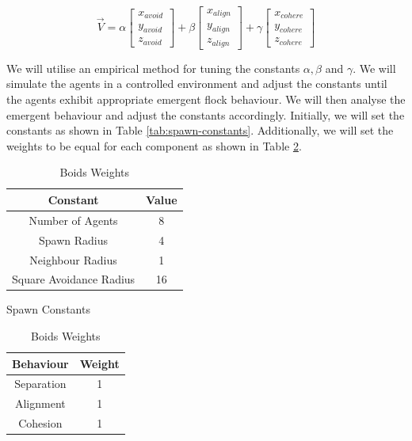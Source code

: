 \documentclass[12pt]{article}
\begin{document}
\begin{equation}
    \vec{V} = \alpha
    \begin{bmatrix}
    x_{avoid} \\
    y_{avoid} \\
    z_{avoid}
    \end{bmatrix}
    +
    \beta
    \begin{bmatrix}
    x_{align} \\
    y_{align} \\
    z_{align}
    \end{bmatrix}
    +
    \gamma
    \begin{bmatrix}
    x_{cohere} \\
    y_{cohere} \\
    z_{cohere}
    \end{bmatrix}
\end{equation}

We will utilise an empirical method for tuning the constants $\alpha, \beta$ and $\gamma$. We will simulate the agents in a controlled environment and adjust the constants until the agents exhibit appropriate emergent flock behaviour. We will then analyse the emergent behaviour and adjust the constants accordingly. Initially, we will set the constants as shown in Table \ref{tab:spawn-constants}. Additionally, we will set the weights to be equal for each component as shown in Table \ref{tab:boids-weights}.

\begin{table}[ht]
    \begin{minipage}{0.45\textwidth}
        \centering
        \begin{tabular}{| c | c |} 
        \hline
        Constant & Value \\ 
        \hline\hline
        Number of Agents & 8 \\
        \hline
        Spawn Radius & 4 \\
        \hline
        Neighbour Radius & 1 \\
        \hline
        Square Avoidance Radius & 16 \\
        \hline
        \end{tabular}
        \caption{Spawn Constants}
        \label{tab:spawn-constants}
    \end{minipage}
    \hfill
    \begin{minipage}{0.45\textwidth}
        \centering
        \begin{tabular}{| c | c |} 
        \hline
        Behaviour & Weight \\ 
        \hline\hline
        Separation & 1 \\
        \hline
        Alignment & 1 \\
        \hline
        Cohesion & 1 \\
        \hline
        \end{tabular}
        \caption{Boids Weights}
        \label{tab:boids-weights}
    \end{minipage}
\end{table}
\end{document}
